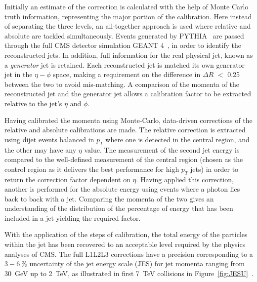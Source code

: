 Initially an estimate of the correction is calculated with the help of Monte Carlo truth information, representing the major portion of the calibration. Here instead of separating the three levels, an all-together approach is used where relative and absolute are tackled simultaneously. Events generated by \textsc{PYTHIA}~\cite{pythia} are passed through the full CMS detector simulation \textsc{GEANT 4}~\cite{GEANT4}, in order to identify the reconstructed jets. In addition, full information for the real physical jet, known as a \textit{generator} jet is retained. Each reconstructed jet is matched its own generator jet in the $\eta - \phi$ space, making a requirement on the difference in $\Delta R$ $<$ 0.25 between the two to avoid mis-matching. A comparison of the momenta of the reconstructed jet and the generator jet allows a calibration factor to be extracted relative to the jet's $\eta$ and $\phi$. 

Having calibrated the momenta using Monte-Carlo, data-driven corrections of the relative and absolute calibrations are made. The relative correction is extracted using dijet events balanced in $p_{T}$ where one is detected in the central region, and the other may have any $\eta$ value. The measurement of the second jet energy is compared to the well-defined measurement of the central region (chosen as the control region as it delivers the best performance for high $p_{T}$ jets) in order to return the correction factor dependent on $\eta$.  Having applied this correction, another is performed for the absolute energy using events where a photon lies back to back with a jet. Comparing the momenta of the two gives an understanding of the distribution of the percentage of energy that has been included in a jet yielding the required factor.

With the application of the steps of calibration, the total energy of the particles within the jet has been recovered to an acceptable level required by the physics analyses of CMS. The full L1L2L3 corrections have a precision corresponding to a $3 - 6~\%$ uncertainty of the jet energy scale (JES) for jet momenta ranging from 30~GeV up to 2~TeV, as illustrated in first 7~TeV collisions in Figure~\ref{fig:JESU}~\cite{JME-10-010}.


